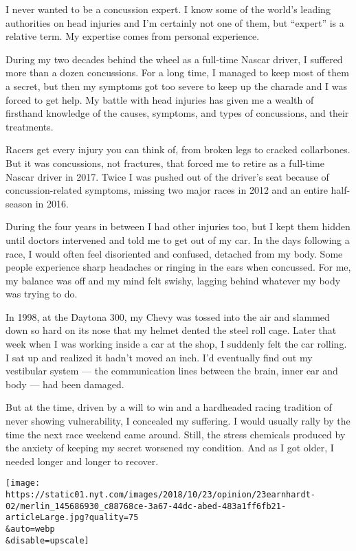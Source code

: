 I never wanted to be a concussion expert. I know some of the world's
leading authorities on head injuries and I'm certainly not one of them,
but ``expert'' is a relative term. My expertise comes from personal
experience.

During my two decades behind the wheel as a full-time Nascar driver, I
suffered more than a dozen concussions. For a long time, I managed to
keep most of them a secret, but then my symptoms got too severe to keep
up the charade and I was forced to get help. My battle with head
injuries has given me a wealth of firsthand knowledge of the causes,
symptoms, and types of concussions, and their treatments.

Racers get every injury you can think of, from broken legs to cracked
collarbones. But it was concussions, not fractures, that forced me to
retire as a full-time Nascar driver in 2017. Twice I was pushed out of
the driver's seat because of concussion-related symptoms, missing two
major races in 2012 and an entire half-season in 2016.

During the four years in between I had other injuries too, but I kept
them hidden until doctors intervened and told me to get out of my car.
In the days following a race, I would often feel disoriented and
confused, detached from my body. Some people experience sharp headaches
or ringing in the ears when concussed. For me, my balance was off and my
mind felt swishy, lagging behind whatever my body was trying to do.

In 1998, at the Daytona 300, my Chevy was tossed into the air and
slammed down so hard on its nose that my helmet dented the steel roll
cage. Later that week when I was working inside a car at the shop, I
suddenly felt the car rolling. I sat up and realized it hadn't moved an
inch. I'd eventually find out my vestibular system --- the communication
lines between the brain, inner ear and body --- had been damaged.

But at the time, driven by a will to win and a hardheaded racing
tradition of never showing vulnerability, I concealed my suffering. I
would usually rally by the time the next race weekend came around.
Still, the stress chemicals produced by the anxiety of keeping my secret
worsened my condition. And as I got older, I needed longer and longer to
recover.

\texttt{[image: https://static01.nyt.com/images/2018/10/23/opinion/23earnhardt-02/merlin\_145686930\_c88768ce-3a67-44dc-abed-483a1ff6fb21-articleLarge.jpg?quality=75\\\&auto=webp\\\&disable=upscale]}

